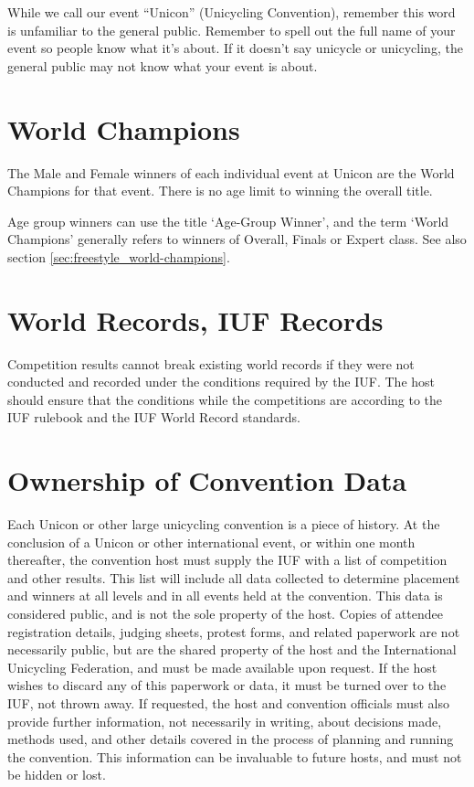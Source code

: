 While we call our event ``Unicon'' (Unicycling Convention), remember this word is unfamiliar to the general public. 
Remember to spell out the full name of your event so people know what it's about. 
If it doesn't say unicycle or unicycling, the general public may not know what your event is about.

\section{World Champions}
The Male and Female winners of each individual event at Unicon are the World Champions for that event. 
There is no age limit to winning the overall title.

Age group winners can use the title `Age-Group Winner', and the term `World Champions' generally refers to winners of Overall, Finals or Expert class. 
See also section \ref{sec:freestyle_world-champions}.


\section{World Records, IUF Records}
Competition results cannot break existing world records if they were not conducted and recorded under the conditions required by the IUF.
The host should ensure that the conditions while the competitions are according to the IUF rulebook and the IUF World Record standards.

\section{Ownership of Convention Data}
Each Unicon or other large unicycling convention is a piece of history.
At the conclusion of a Unicon or other international event, or within one month thereafter, the convention host must supply the IUF with a list of competition and other results.
This list will include all data collected to determine placement and winners at all levels and in all events held at the convention.
This data is considered public, and is not the sole property of the host.
Copies of attendee registration details, judging sheets, protest forms, and related paperwork are not necessarily public, but are the shared property of the host and the International Unicycling Federation, and must be made available upon request.
If the host wishes to discard any of this paperwork or data, it must be turned over to the IUF, not thrown away.
If requested, the host and convention officials must also provide further information, not necessarily in writing, about decisions made, methods used, and other details covered in the process of planning and running the convention.
This information can be invaluable to future hosts, and must not be hidden or lost.

